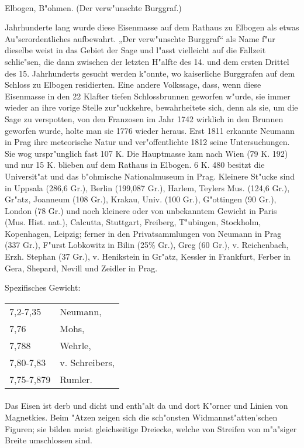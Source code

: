 \documentclass[a4paper, 11pt, oneside]{article}
\begin{document}
\paragraph{}
Elbogen, B"ohmen. (Der verw"unschte Burggraf.)

Jahrhunderte lang wurde diese Eisenmasse auf dem Rathaus zu Elbogen als etwas Au"serordentliches aufbewahrt. „Der verw"unschte Burggraf“ als Name f"ur dieselbe weist in das Gebiet der Sage und l"asst vielleicht auf die Fallzeit schlie"sen, die dann zwischen der letzten H"alfte des 14. und dem ersten Drittel des 15. Jahrhunderts gesucht werden k"onnte, wo kaiserliche Burggrafen auf dem Schloss zu Elbogen residierten. Eine andere Volkssage, dass, wenn diese Eisenmasse in den 22 Klafter tiefen Schlossbrunnen geworfen w"urde, sie immer wieder an ihre vorige Stelle zur"uckkehre, bewahrheitete sich, denn als sie, um die Sage zu verspotten, von den Franzosen im Jahr 1742 wirklich in den Brunnen geworfen wurde, holte man sie 1776 wieder heraus. Erst 1811 erkannte Neumann in Prag ihre meteorische Natur und ver"offentlichte 1812 seine Untersuchungen. Sie wog urspr"unglich fast 107 K. Die Hauptmasse kam nach Wien (79 K. 192) und nur 15 K. blieben auf dem Rathaus in Elbogen. 6 K. 480 besitzt die Universit"at und das b"ohmische Nationalmuseum in Prag. Kleinere St"ucke sind in Uppsala (286,6 Gr.), Berlin (199,087 Gr.), Harlem, Teylers Mus. (124,6 Gr.), Gr"atz, Joanneum (108 Gr.), Krakau, Univ. (100 Gr.), G"ottingen (90 Gr.), London (78 Gr.) und noch kleinere oder von unbekanntem Gewicht in Paris (Mus. Hist. nat.), Calcutta, Stuttgart, Freiberg, T"ubingen, Stockholm, Kopenhagen, Leipzig; ferner in den Privatsammlungen von Neumann in Prag (337 Gr.), F"urst Lobkowitz in Bilin (25\% Gr.), Greg (60 Gr.), v. Reichenbach, Erzh. Stephan (37 Gr.), v. Henikstein in Gr"atz, Kessler in Frankfurt, Ferber in Gera, Shepard, Nevill und Zeidler in Prag.

Spezifisches Gewicht:  
\begin{table}[!ht]
    \centering
    \begin{tabular}{l l}
        7,2-7,35 & Neumann,\\
        7,76 & Mohs,\\
        7,788 & Wehrle,\\
        7,80-7,83 & v. Schreibers,\\
        7,75-7,879 & Rumler.
    \end{tabular}
\end{table}
\paragraph{}
Das Eisen ist derb und dicht und enth"alt da und dort K"orner und Linien von Magnetkies. Beim "Atzen zeigen sich die sch"onsten Widmannst"atten'schen Figuren; sie bilden meist gleichseitige Dreiecke, welche von Streifen von m"a"siger Breite umschlossen sind.
\end{document}
